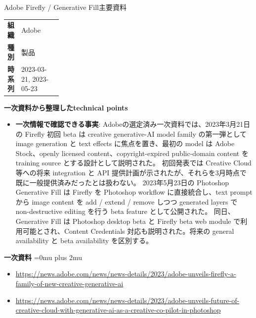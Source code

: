 \begin{technicalnote}{Adobe Firefly / Generative Fill}{主要資料}
\begingroup
\begin{tabularx}{\linewidth}{@{}>{\bfseries}p{0.22\linewidth}X@{}}
組織 & Adobe \\
種別 & 製品 \\
時系列 & 2023-03-21, 2023-05-23 \\
\end{tabularx}
\smallskip
{\bfseries 一次資料から整理したtechnical points}
\begin{itemize}[leftmargin=1.5em,itemsep=0.35em]
\item \textbf{一次情報で確認できる事実}: Adobeの選定済み一次資料では、2023年3月21日の Firefly 初回 beta は creative generative-AI model family の第一弾として image generation と text effects に焦点を置き、最初の model は Adobe Stock、openly licensed content、copyright-expired public-domain content を training source とする設計として説明された。 初回発表では Creative Cloud 等への将来 integration と API 提供計画が示されたが、それらを3月時点で既に一般提供済みだったとは扱わない。 2023年5月23日の Photoshop Generative Fill は Firefly を Photoshop workflow に直接統合し、text prompt から image content を add / extend / remove しつつ generated layers で non-destructive editing を行う beta feature として公開された。 同日、Generative Fill は Photoshop desktop beta と Firefly beta web module で利用可能とされ、Content Credentials 対応も説明された。将来の general availability と beta availability を区別する。
\end{itemize}
\begin{minipage}{\linewidth}
\begin{samepage}
{\bfseries 一次資料}
\begingroup\sloppy
\Urlmuskip=0mu plus 2mu\relax
\begin{itemize}[leftmargin=1.5em,itemsep=0.25em]
\item {\scriptsize\url{https://news.adobe.com/news/news-details/2023/adobe-unveils-firefly-a-family-of-new-creative-generative-ai}}
\item {\scriptsize\url{https://news.adobe.com/news/news-details/2023/adobe-unveils-future-of-creative-cloud-with-generative-ai-as-a-creative-co-pilot-in-photoshop}}
\end{itemize}
\endgroup
\end{samepage}
\end{minipage}
\endgroup
\end{technicalnote}
\medskip
